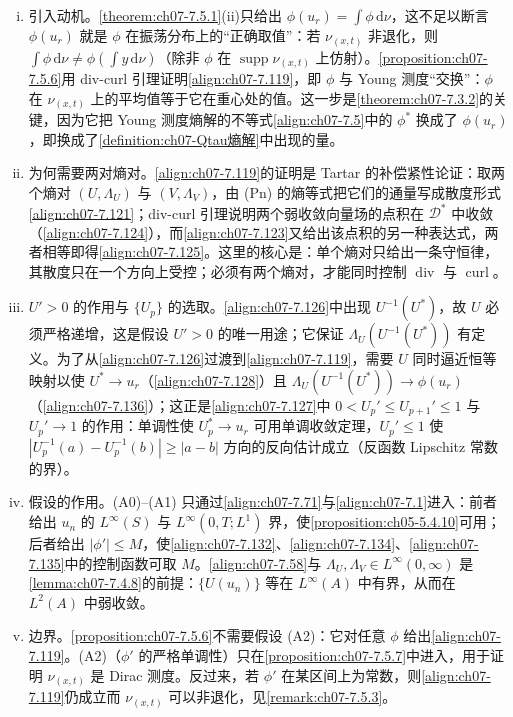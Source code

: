 \documentclass[../../main.tex]{subfiles}%
\begin{document}
\begin{remark}\label{remark:ch07-7.5.6动机}
\begin{enumerate}[(i)]
\item 引入动机。\cref{theorem:ch07-7.5.1}(ii)只给出 $\phi(u_r)=\int\phi\,\mathrm{d}\nu$，这不足以断言 $\phi(u_r)$ 就是 $\phi$ 在振荡分布上的“正确取值”：若 $\nu_{(x,t)}$ 非退化，则 $\int\phi\,\mathrm{d}\nu\neq\phi(\int y\,\mathrm{d}\nu)$（除非 $\phi$ 在 $\operatorname{supp}\nu_{(x,t)}$ 上仿射）。\cref{proposition:ch07-7.5.6}用 div-curl 引理证明\eqref{align:ch07-7.119}，即 $\phi$ 与 Young 测度“交换”：$\phi$ 在 $\nu_{(x,t)}$ 上的平均值等于它在重心处的值。这一步是\cref{theorem:ch07-7.3.2}的关键，因为它把 Young 测度熵解的不等式\eqref{align:ch07-7.5}中的 $\phi^*$ 换成了 $\phi(u_r)$，即换成了\cref{definition:ch07-Qtau熵解}中出现的量。
\item 为何需要两对熵对。\eqref{align:ch07-7.119}的证明是 Tartar 的补偿紧性论证：取两个熵对 $(U,\Lambda_U)$ 与 $(V,\Lambda_V)$，由 (Pn) 的熵等式把它们的通量写成散度形式\eqref{align:ch07-7.121}；div-curl 引理说明两个弱收敛向量场的点积在 $\mathcal{D}^*$ 中收敛（\eqref{align:ch07-7.124}），而\eqref{align:ch07-7.123}又给出该点积的另一种表达式，两者相等即得\eqref{align:ch07-7.125}。这里的核心是：单个熵对只给出一条守恒律，其散度只在一个方向上受控；必须有两个熵对，才能同时控制 $\operatorname{div}$ 与 $\operatorname{curl}$。
\item $U'>0$ 的作用与 $\{U_p\}$ 的选取。\eqref{align:ch07-7.126}中出现 $U^{-1}(U^*)$，故 $U$ 必须严格递增，这是假设 $U'>0$ 的唯一用途；它保证 $\Lambda_U(U^{-1}(U^*))$ 有定义。为了从\eqref{align:ch07-7.126}过渡到\eqref{align:ch07-7.119}，需要 $U$ 同时逼近恒等映射以使 $U^*\to u_r$（\eqref{align:ch07-7.128}）且 $\Lambda_U(U^{-1}(U^*))\to\phi(u_r)$（\eqref{align:ch07-7.136}）；这正是\eqref{align:ch07-7.127}中 $0<U_p'\leqslant U_{p+1}'\leqslant1$ 与 $U_p'\to1$ 的作用：单调性使 $U_p^*\to u_r$ 可用单调收敛定理，$U_p'\leqslant1$ 使 $|U_p^{-1}(a)-U_p^{-1}(b)|\geqslant|a-b|$ 方向的反向估计成立（反函数 Lipschitz 常数的界）。
\item 假设的作用。(A0)--(A1) 只通过\eqref{align:ch07-7.71}与\eqref{align:ch07-7.1}进入：前者给出 $u_n$ 的 $L^\infty(S)$ 与 $L^\infty(0,T;L^1)$ 界，使\cref{proposition:ch05-5.4.10}可用；后者给出 $|\phi'|\leqslant M$，使\eqref{align:ch07-7.132}、\eqref{align:ch07-7.134}、\eqref{align:ch07-7.135}中的控制函数可取 $M$。\eqref{align:ch07-7.58}与 $\Lambda_U,\Lambda_V\in L^\infty(0,\infty)$ 是\cref{lemma:ch07-7.4.8}的前提：$\{U(u_n)\}$ 等在 $L^\infty(A)$ 中有界，从而在 $L^2(A)$ 中弱收敛。
\item 边界。\cref{proposition:ch07-7.5.6}不需要假设 (A2)：它对任意 $\phi$ 给出\eqref{align:ch07-7.119}。(A2)（$\phi'$ 的严格单调性）只在\cref{proposition:ch07-7.5.7}中进入，用于证明 $\nu_{(x,t)}$ 是 Dirac 测度。反过来，若 $\phi'$ 在某区间上为常数，则\eqref{align:ch07-7.119}仍成立而 $\nu_{(x,t)}$ 可以非退化，见\cref{remark:ch07-7.5.3}。
\end{enumerate}
\end{remark}
\end{document}

